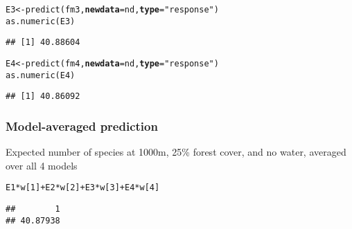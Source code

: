 \documentclass[color=usenames,dvipsnames]{beamer}\usepackage[]{graphicx}\usepackage[]{color}
\makeatletter
\newcommand{\hlnum}[1]{\textcolor[rgb]{0.69,0.494,0}{#1}}%
\newcommand{\hlstr}[1]{\textcolor[rgb]{0.749,0.012,0.012}{#1}}%
\newcommand{\hlopt}[1]{\textcolor[rgb]{0,0,0}{#1}}%
\newcommand{\hlstd}[1]{\textcolor[rgb]{0,0,0}{#1}}%
\newcommand{\hlkwb}[1]{\textcolor[rgb]{0,0.341,0.682}{#1}}%
\newcommand{\hlkwc}[1]{\textcolor[rgb]{0,0,0}{\textbf{#1}}}%
\newcommand{\hlkwd}[1]{\textcolor[rgb]{0.004,0.004,0.506}{#1}}%
\newenvironment{kframe}{%
 \def\at@end@of@kframe{}%
 \ifinner\ifhmode%
  \def\at@end@of@kframe{\end{minipage}}%
  \begin{minipage}{\columnwidth}%
 \fi\fi%
 \def\FrameCommand##1{\hskip\@totalleftmargin \hskip-\fboxsep
 \colorbox{shadecolor}{##1}\hskip-\fboxsep
     \hskip-\linewidth \hskip-\@totalleftmargin \hskip\columnwidth}%
 \MakeFramed {\advance\hsize-\width
   \@totalleftmargin\z@ \linewidth\hsize
   \@setminipage}}%
 {\par\unskip\endMakeFramed%
 \at@end@of@kframe}
\newenvironment{knitrout}{}{} %
\makeatother
\begin{document}
\begin{frame}[fragile]
\begin{knitrout}
\begin{kframe}
\begin{alltt}
\hlstd{E3} \hlkwb{<-} \hlkwd{predict}\hlstd{(fm3,} \hlkwc{newdata}\hlstd{=nd,} \hlkwc{type}\hlstd{=}\hlstr{"response"}\hlstd{)}
\hlkwd{as.numeric}\hlstd{(E3)}
\end{alltt}
\begin{verbatim}
## [1] 40.88604
\end{verbatim}
\end{kframe}
\end{knitrout}
\pause
\vfill
\begin{knitrout}\footnotesize
{}\color{fgcolor}\begin{kframe}
\begin{alltt}
\hlstd{E4} \hlkwb{<-} \hlkwd{predict}\hlstd{(fm4,} \hlkwc{newdata}\hlstd{=nd,} \hlkwc{type}\hlstd{=}\hlstr{"response"}\hlstd{)}
\hlkwd{as.numeric}\hlstd{(E4)}
\end{alltt}
\begin{verbatim}
## [1] 40.86092
\end{verbatim}
\end{kframe}
\end{knitrout}
\end{frame}




\begin{frame}[fragile]
  \frametitle{Model-averaged prediction}
  {Expected number of species at 1000m, 25\% forest cover, and no
    water, averaged over \alert{all} 4 models}
  \pause
  \vspace{1pt}
\begin{knitrout}
\color{fgcolor}\begin{kframe}
\begin{alltt}
\hlstd{E1}\hlopt{*}\hlstd{w[}\hlnum{1}\hlstd{]} \hlopt{+} \hlstd{E2}\hlopt{*}\hlstd{w[}\hlnum{2}\hlstd{]} \hlopt{+} \hlstd{E3}\hlopt{*}\hlstd{w[}\hlnum{3}\hlstd{]} \hlopt{+} \hlstd{E4}\hlopt{*}\hlstd{w[}\hlnum{4}\hlstd{]}
\end{alltt}
\begin{verbatim}
##        1 
## 40.87938
\end{verbatim}
\end{kframe}
\end{knitrout}
\end{frame}
\end{document}
